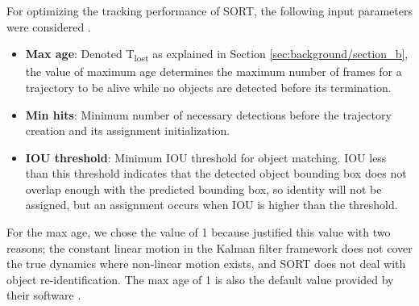 For optimizing the tracking performance of SORT, the following input parameters were considered \cite{bewley_simple_2016}.
\begin{itemize}
    \item \textbf{Max age}: Denoted T\textsubscript{lost} as explained in Section \ref{sec:background/section_b}, the value of maximum age determines the maximum number of frames for a trajectory to be alive while no objects are detected before its termination.
    \item \textbf{Min hits}: Minimum number of necessary detections before the trajectory creation and its assignment initialization.
    \item \textbf{IOU threshold}: Minimum IOU threshold for object matching. IOU less than this threshold indicates that the detected object bounding box does not overlap enough with the predicted bounding box, so identity will not be assigned, but an assignment occurs when IOU is higher than the threshold.
\end{itemize}
For the max age, we chose the value of 1 because \citeauthor{bewley_simple_2016} \cite{bewley_simple_2016} justified this value with two reasons; the constant linear motion in the Kalman filter framework does not cover the true dynamics where non-linear motion exists, and SORT does not deal with object re-identification. The max age of 1 is also the default value provided by their software \cite{abewley_abewleysort_2021}.

